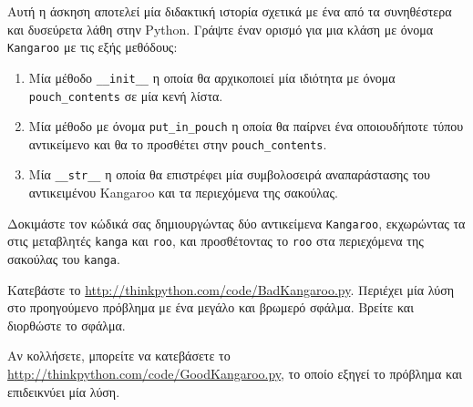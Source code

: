 \documentclass[10pt]{book}
\begin{document}
\begin{exercise}

Αυτή η άσκηση αποτελεί μία διδακτική ιστορία σχετικά με ένα από τα συνηθέστερα και δυσεύρετα λάθη στην Python.
Γράψτε έναν ορισμό για μια κλάση με όνομα {\tt Kangaroo} με τις εξής μεθόδους: 

\begin{enumerate}

\item Μία μέθοδο \verb"__init__" η οποία θα αρχικοποιεί μία ιδιότητα με
όνομα \verb"pouch_contents" σε μία κενή λίστα.

\item Μία μέθοδο με όνομα \verb"put_in_pouch" η οποία θα παίρνει ένα οποιουδήποτε
τύπου αντικείμενο και θα το προσθέτει στην \verb"pouch_contents". 

\item Μία \verb"__str__" η οποία θα επιστρέφει μία συμβολοσειρά αναπαράστασης του 
αντικειμένου Kangaroo και τα περιεχόμενα της σακούλας.

\end{enumerate}
%
Δοκιμάστε τον κώδικά σας δημιουργώντας δύο αντικείμενα {\tt Kangaroo}, εκχωρώντας τα στις μεταβλητές
{\tt kanga} και {\tt roo}, και προσθέτοντας το {\tt roo} στα περιεχόμενα της σακούλας του {\tt kanga}.

Κατεβάστε το \url{http://thinkpython.com/code/BadKangaroo.py}. Περιέχει μία λύση στο προηγούμενο πρόβλημα
με ένα μεγάλο και βρωμερό σφάλμα. Βρείτε και διορθώστε το σφάλμα.

Αν κολλήσετε, μπορείτε να κατεβάσετε το \url{http://thinkpython.com/code/GoodKangaroo.py}, το οποίο εξηγεί
το πρόβλημα και επιδεικνύει	μία λύση.

\end{exercise}
\end{document}

